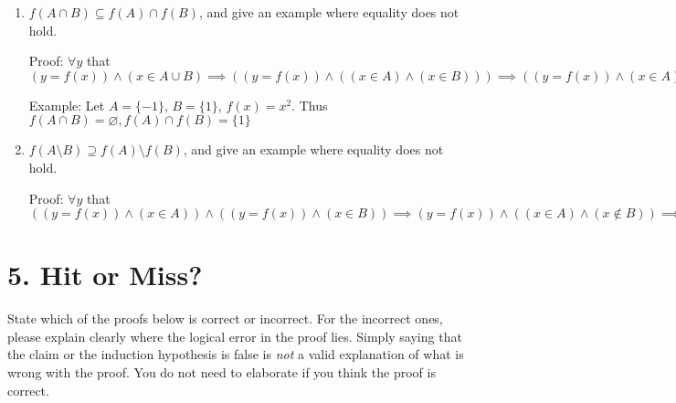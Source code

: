\documentclass{article}\usepackage{amsmath,amssymb,amsthm,tikz,tkz-graph,color,chngpage,soul,hyperref,csquotes,graphicx,floatrow, yfonts}\newcommand*{\QEDB}{\hfill\ensuremath{\square}}\newtheorem*{prop}{Proposition}\renewcommand{\theenumi}{\alph{enumi}}\usepackage[shortlabels]{enumitem}\usepackage[nobreak=true, framemethod=tikz]{mdframed}\usetikzlibrary{matrix,calc, automata, positioning}\MakeOuterQuote{"}\usepackage[margin=1in]{geometry} \newtheorem{theorem}{Theorem}
\begin{document}
\begin{enumerate}
    \item $f(A \cap B) \subseteq f(A) \cap f(B)$, and give an example where equality does not hold.
    \begin{mdframed}
     Proof: $ \forall y $ that $ (y = f(x)) \land (x \in A \cup B) \implies ((y = f(x)) \land ((x \in A) \land (x \in B))) \implies ((y = f(x)) \land (x \in A)) \land ((y = f(x)) \land (x \in B)) \implies y \in f(A) \cap f(B)$ \par
     Example: Let $A = \{-1\}$, $B = \{1\}$, $f(x) = x^2$. Thus $f(A \cap B) = \varnothing, f(A) \cap f(B) = \{ 1 \}$
     
    \end{mdframed}
    
    \item $f(A \setminus B) \supseteq f(A) \setminus f(B)$, and give an example where equality does not hold.
    \begin{mdframed}
     Proof: $ \forall y $ that $ ((y = f(x)) \land (x \in A)) \land ((y = f(x)) \land (x \in B)) \implies (y = f(x)) \land ((x \in A) \land (x \notin B)) \implies y \in f(A \setminus B)$
    \end{mdframed}
    
\end{enumerate}

\pagebreak

\section*{5. Hit or Miss?}
State which of the proofs below is correct or incorrect.
For the incorrect ones, please explain clearly where the logical error in the proof lies.
Simply saying that the claim or the induction hypothesis is false is \emph{not} a valid explanation of what is wrong with the proof.
You do not need to elaborate if you think the proof is correct.
\end{document}
